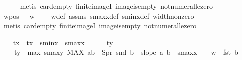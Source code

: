 \begin{isabellebody}
\ \ \ \ \isamarkupfalse%
\ {\isacharparenleft}{\kern0pt}metis\ card{\isachardot}{\kern0pt}empty\ finite{\isacharunderscore}{\kern0pt}imageI\ image{\isacharunderscore}{\kern0pt}is{\isacharunderscore}{\kern0pt}empty\ not{\isacharunderscore}{\kern0pt}numeral{\isacharunderscore}{\kern0pt}le{\isacharunderscore}{\kern0pt}zero{\isacharparenright}{\kern0pt}\isanewline
\ \ \isamarkupfalse%
\ w{}{\isacharunderscore}{\kern0pt}pos\ \ {\isacharcolon}{\kern0pt}\ {\isachardoublequoteopen}w{}\ {\isasymge}\ {}{\isachardoublequoteclose}\ \isamarkupfalse%
\ w{}{\isacharunderscore}{\kern0pt}def\ assms{\isacharparenleft}{\kern0pt}{}{\isacharcomma}{\kern0pt}{}{\isacharparenright}{\kern0pt}\ s{}{\isacharunderscore}{\kern0pt}maxx{\isacharunderscore}{\kern0pt}def\ s{}{\isacharunderscore}{\kern0pt}minx{\isacharunderscore}{\kern0pt}def\ width{\isacharunderscore}{\kern0pt}non{\isacharunderscore}{\kern0pt}zero\isanewline
\ \ \ \ \isamarkupfalse%
\ {\isacharparenleft}{\kern0pt}metis\ card{\isachardot}{\kern0pt}empty\ finite{\isacharunderscore}{\kern0pt}imageI\ image{\isacharunderscore}{\kern0pt}is{\isacharunderscore}{\kern0pt}empty\ not{\isacharunderscore}{\kern0pt}numeral{\isacharunderscore}{\kern0pt}le{\isacharunderscore}{\kern0pt}zero{\isacharparenright}{\kern0pt}%
\begin{isamarkuptext}%
%
\end{isamarkuptext}\isamarkuptrue%
\ \ \isamarkupfalse%
\ tx\ \ {\isachardoublequoteopen}tx\ {\isacharequal}{\kern0pt}\ {\isacharminus}{\kern0pt}s{}{\isacharunderscore}{\kern0pt}minx\ {\isacharplus}{\kern0pt}\ s{}{\isacharunderscore}{\kern0pt}maxx\ {\isacharplus}{\kern0pt}\ {}{\isachardoublequoteclose}\isanewline
\ \ \isamarkupfalse%
\ ty{}\ \isanewline
\ \ \ \ {\isachardoublequoteopen}ty{}\ {\isacharequal}{\kern0pt}\ max\ s{}{\isacharunderscore}{\kern0pt}maxy\ {\isacharparenleft}{\kern0pt}MAX\ {\isacharparenleft}{\kern0pt}a{\isacharcomma}{\kern0pt}b{\isacharparenright}{\kern0pt}\ {\isasymin}\ S{}pr{\isachardot}{\kern0pt}\ snd\ b\ {\isacharplus}{\kern0pt}\ {\isacharparenleft}{\kern0pt}slope\ a\ b{\isacharparenright}{\kern0pt}\ {\isacharasterisk}{\kern0pt}\ {\isacharparenleft}{\kern0pt}{\isacharparenleft}{\kern0pt}s{}{\isacharunderscore}{\kern0pt}maxx\ {\isacharplus}{\kern0pt}\ {}{\isacharparenright}{\kern0pt}\ {\isacharplus}{\kern0pt}\ w{}\ {\isacharminus}{\kern0pt}\ fst\ b{\isacharparenright}{\kern0pt}{\isacharparenright}{\kern0pt}{\isachardoublequoteclose}\isanewline

\end{isabellebody}

